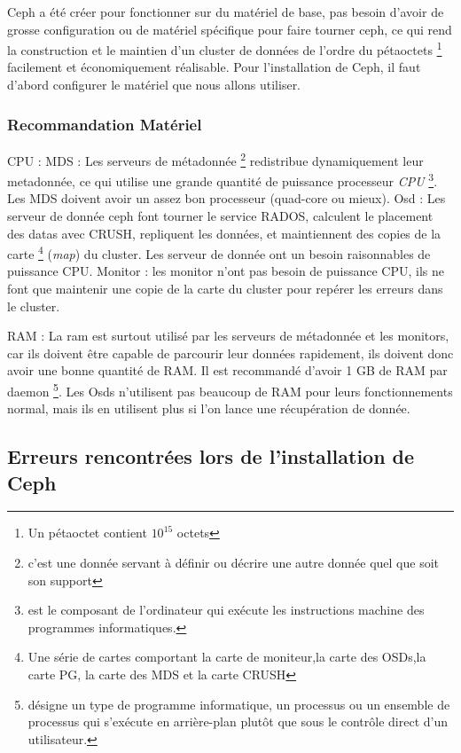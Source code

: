 \documentclass[12pt]{article}
\begin{document}
	Ceph a été créer pour fonctionner sur du matériel de base, pas besoin d'avoir de grosse configuration ou de matériel spécifique pour faire tourner ceph, ce qui rend la construction et le maintien d'un cluster de données de l'ordre du pétaoctets \footnote{Un pétaoctet contient \begin{math}10^{15}\end{math} octets} facilement et économiquement réalisable.
	Pour l'installation de Ceph, il faut d'abord configurer le matériel que nous allons utiliser.

 \subsubsection{Recommandation Matériel }	
	
	CPU :
	MDS : Les serveurs de métadonnée \footnote{c'est une donnée servant à définir ou décrire une autre donnée quel que soit son support} redistribue dynamiquement leur metadonnée, ce qui utilise une grande quantité de puissance processeur \textit{CPU} \footnote{est le composant de l'ordinateur qui exécute les instructions machine des programmes informatiques.}. Les MDS doivent avoir un assez bon processeur (quad-core ou mieux).
	Osd : Les serveur de donnée ceph font tourner le service RADOS, calculent le placement des datas avec CRUSH, repliquent les données, et maintiennent des copies de la carte \footnote{Une série de cartes comportant la carte de moniteur,la carte des OSDs,la carte PG, la carte des MDS et la carte CRUSH} (\textit{map}) du cluster. Les serveur de donnée ont un besoin raisonnables de puissance CPU.
	Monitor : les monitor n'ont pas besoin de puissance CPU, ils ne font que maintenir une copie de la carte du cluster pour repérer les erreurs dans le cluster.
	
	RAM :
	La ram est surtout utilisé par les serveurs de métadonnée et les monitors, car ils doivent être capable de parcourir leur données rapidement, ils doivent donc avoir une bonne quantité de RAM. Il est recommandé d'avoir 1 GB de RAM par daemon \footnote{désigne un type de programme informatique, un processus ou un ensemble de processus qui s'exécute en arrière-plan plutôt que sous le contrôle direct d'un utilisateur.}.
	Les Osds n'utilisent pas beaucoup de RAM pour leurs fonctionnements normal, mais ils en utilisent plus si l'on lance une récupération de donnée.
	
	\subsection{Erreurs rencontrées lors de l'installation de Ceph}
\end{document}
